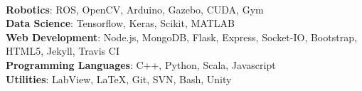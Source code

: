 \ifdefined\ONEPAGE
\\
\textbf{Robotics}: ROS, OpenCV, Arduino, Gazebo, CUDA, Gym\\
\textbf{Data Science}: Tensorflow, Keras, Scikit, MATLAB\\
\textbf{Web Development}: Node.js, MongoDB, Flask, Express, Socket-IO, Bootstrap, HTML5,  Jekyll, Travis CI\\
\textbf{Programming Languages}: C++, Python, Scala, Javascript\\
\textbf{Utilities}: LabView, \LaTeX, Git, SVN, Bash, Unity
\else
\fi
